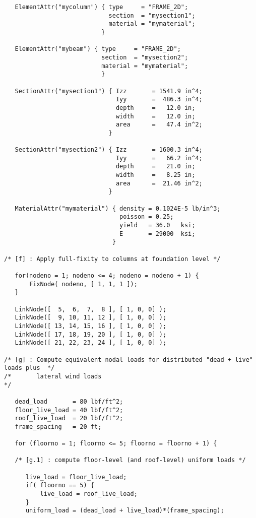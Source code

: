 \begin{footnotesize}
\begin{verbatim}
   ElementAttr("mycolumn") { type     = "FRAME_2D";
                             section  = "mysection1";
                             material = "mymaterial";
                           }

   ElementAttr("mybeam") { type     = "FRAME_2D";
                           section  = "mysection2";
                           material = "mymaterial";
                           }

   SectionAttr("mysection1") { Izz       = 1541.9 in^4;
                               Iyy       =  486.3 in^4;
                               depth     =   12.0 in;
                               width     =   12.0 in;
                               area      =   47.4 in^2;
                             }

   SectionAttr("mysection2") { Izz       = 1600.3 in^4;
                               Iyy       =   66.2 in^4;
                               depth     =   21.0 in;
                               width     =   8.25 in;
                               area      =  21.46 in^2;
                             }

   MaterialAttr("mymaterial") { density = 0.1024E-5 lb/in^3;
                                poisson = 0.25;
                                yield   = 36.0   ksi;
                                E       = 29000  ksi;
                              }

/* [f] : Apply full-fixity to columns at foundation level */

   for(nodeno = 1; nodeno <= 4; nodeno = nodeno + 1) {
       FixNode( nodeno, [ 1, 1, 1 ]);
   }

   LinkNode([  5,  6,  7,  8 ], [ 1, 0, 0] );
   LinkNode([  9, 10, 11, 12 ], [ 1, 0, 0] );
   LinkNode([ 13, 14, 15, 16 ], [ 1, 0, 0] );
   LinkNode([ 17, 18, 19, 20 ], [ 1, 0, 0] );
   LinkNode([ 21, 22, 23, 24 ], [ 1, 0, 0] );

/* [g] : Compute equivalent nodal loads for distributed "dead + live" loads plus  */
/*       lateral wind loads                                                       */

   dead_load       = 80 lbf/ft^2;
   floor_live_load = 40 lbf/ft^2;
   roof_live_load  = 20 lbf/ft^2;
   frame_spacing   = 20 ft;

   for (floorno = 1; floorno <= 5; floorno = floorno + 1) {

   /* [g.1] : compute floor-level (and roof-level) uniform loads */

      live_load = floor_live_load;
      if( floorno == 5) {
          live_load = roof_live_load;
      }
      uniform_load = (dead_load + live_load)*(frame_spacing);


\end{verbatim}
\end{footnotesize}
